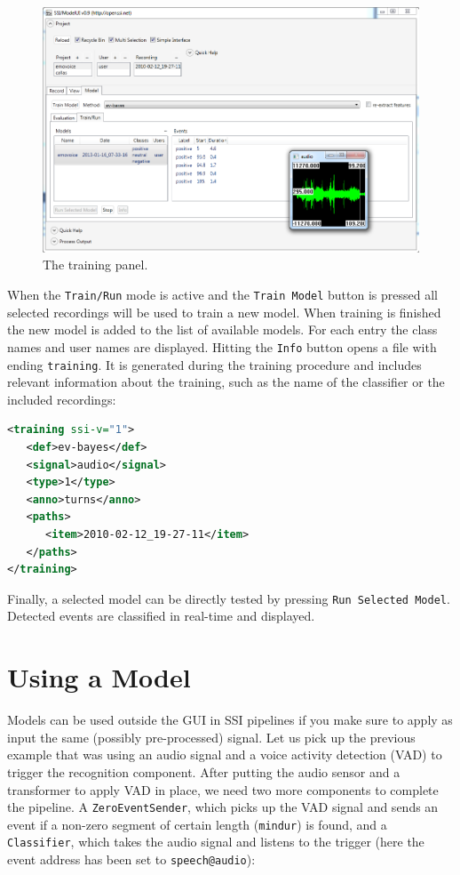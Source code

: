 \begin{figure}[h]
\begin{center}
\includegraphics[width=0.75\linewidth]{pics/train_gui_train.png}
\end{center}
\caption{The training panel.}
\label{fig:train_gui}
\end{figure}

When the \texttt{Train/Run} mode is active and the \texttt{Train Model} button is pressed all selected recordings will be used to train a new model. When training is finished the new model is added to the list of available models. For each entry the class names and user names are displayed. Hitting the \texttt{Info} button opens a file with ending \texttt{training}. It is generated during the training procedure and includes relevant information about the training, such as the name of the classifier or the included recordings:
 
\begin{lstlisting}[language=xml]
<training ssi-v="1">
   <def>ev-bayes</def>
   <signal>audio</signal>
   <type>1</type>
   <anno>turns</anno>
   <paths>
      <item>2010-02-12_19-27-11</item>
   </paths>
</training>
\end{lstlisting}
 
Finally, a selected model can be directly tested by pressing \texttt{Run Selected Model}. Detected events are classified in real-time and displayed.

\section{Using a Model}\label{lab:train_overview}

Models can be used outside the GUI in SSI pipelines if you make sure to apply as input the same (possibly pre-processed) signal. Let us pick up the previous example that was using an audio signal and a voice activity detection (VAD) to trigger the recognition component. After putting the audio sensor and a transformer to apply VAD in place, we need two more components to complete the pipeline. A \texttt{ZeroEventSender}, which picks up the VAD signal and sends an event if a non-zero segment of certain length (\texttt{mindur}) is found, and a \texttt{Classifier}, which takes the audio signal and listens to the trigger (here the event address has been set to \texttt{speech@audio}):

